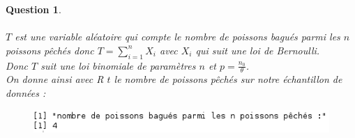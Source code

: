 \documentclass[a4paper,11pt]{article}
\newtheorem{exo1}{Question}
\begin{document}
\begin{exo1} \ \\ \\
$T$ est une variable aléatoire qui compte le nombre de poissons bagués parmi les $n$ poissons pêchés donc $T=\sum\limits_{i=1}^{n}X_{i}$ avec $X_{i}$ qui suit une loi de Bernoulli. \ \\
Donc $T$ suit une loi binomiale de paramètres $n$ et $p=\frac{n_{0}}{\theta}$. \ \\
On donne ainsi avec R $t$ le nombre de poissons pêchés sur notre échantillon de données :
\begin{figure}[h]
\includegraphics[scale=0.7]{images/Q1_2.png}
\end{figure} \ \\
\end{exo1}
\end{document}
